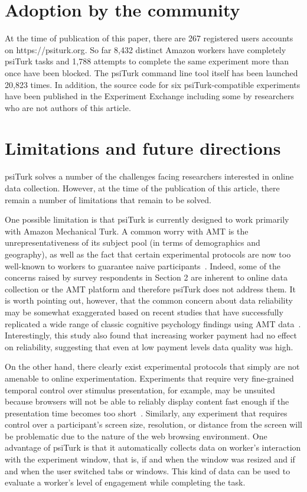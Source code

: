 \documentclass[twocolumn]{svjour3}          %
\newcommand{\psiturk}[0]{\textsf{psiTurk}}
\begin{document}
\section{Adoption by the community}

At the time of publication of this paper, there are 267 registered users accounts
on \textsf{https://psiturk.org}.  So far 8,432 distinct Amazon workers have completely
\textsf{psiTurk} tasks and 1,788 attempts to complete the same experiment more
than once have been blocked.   The \textsf{psiTurk} command line tool itself has been
launched 20,823 times.  In addition, the source code for six \textsf{psiTurk}-compatible experiments
have been published in the Experiment Exchange including some by researchers
who are not authors of this article.

\section{Limitations and future directions}

\psiturk{} solves a number of the challenges facing researchers interested in online data collection.
However, at the time of the publication of this article, there remain a number of limitations 
that remain to be solved.

One possible limitation is that \psiturk{} is currently designed to work primarily with Amazon Mechanical Turk. 
A common worry with AMT is the unrepresentativeness of its subject pool (in terms of demographics and 
geography), as well as the fact that certain experimental protocols are now too well-known to workers to guarantee naive
participants~\citep{chandler2014nonnaivete}.  Indeed, some of the concerns raised by survey respondents in Section 2 are inherent 
to online data collection or the AMT platform and therefore \psiturk{} does not address them.
It is worth pointing out, however, that the common concern about data reliability may be somewhat exaggerated 
based on recent studies that have successfully replicated a wide range of classic cognitive psychology findings using 
AMT data~\citep{crump2013evaluating}. Interestingly, this study also found that increasing worker payment had no effect on 
reliability, suggesting that even  at low payment levels data quality was high. 

On the other hand, there clearly exist experimental protocols that simply are not amenable to online
experimentation. Experiments that require very fine-grained temporal control over stimulus presentation, for example, 
may be unsuited because browsers will not be able to reliably display content fast enough if the presentation time
becomes too short~\citep{crump2013evaluating}.
Similarly, any experiment that requires control over a participant's screen size, resolution, or distance from the screen will 
be problematic due to the nature of the web browsing environment.
One advantage of \psiturk{} is that it automatically collects data on worker's interaction with the experiment window, that is, 
if and when the window was resized and if and when the user switched tabs or windows. 
This kind of data can be used to evaluate a worker's level of engagement while completing the task.
\end{document}
